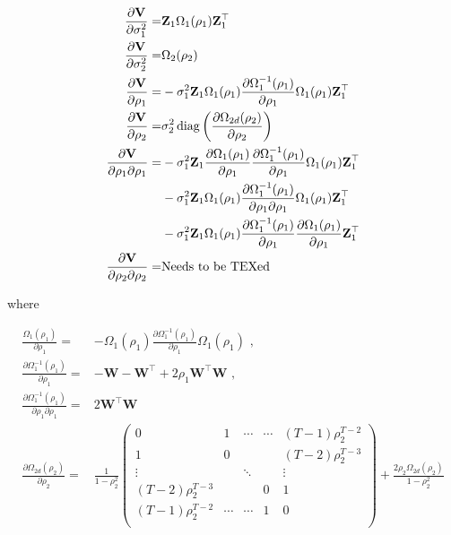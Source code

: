 \begin{align*}
\frac{\partial\mathbf{V}}{\partial\sigma_1^2} =& \mathbf{Z}_1\Omega_1(\rho_1)\mathbf{Z}_1^\top \\
\frac{\partial\mathbf{V}}{\partial\sigma_2^2} =& \Omega_2(\rho_2) \\
\frac{\partial\mathbf{V}}{\partial\rho_1} =& -\sigma_1^2\mathbf{Z}_1\Omega_1(\rho_1)\frac{\partial\Omega_1^{-1}(\rho_1)}{\partial\rho_1}\Omega_1(\rho_1)\mathbf{Z}^\top_1 \\
\frac{\partial\mathbf{V}}{\partial\rho_2} =& \sigma_2^2 \operatorname{diag}\left(\frac{\partial\Omega_{2d}(\rho_2)}{\partial\rho_2}\right) \\
\frac{\partial\mathbf{V}}{\partial\rho_1\partial\rho_1} =& -\sigma_1^2\mathbf{Z}_1\frac{\partial\Omega_1(\rho_1)}{\partial\rho_1}\frac{\partial\Omega_1^{-1}(\rho_1)}{\partial\rho_1}\Omega_1(\rho_1)\mathbf{Z}^\top_1 \\
&-\sigma_1^2\mathbf{Z}_1\Omega_1(\rho_1)\frac{\partial\Omega_1^{-1}(\rho_1)}{\partial\rho_1\partial\rho_1}\Omega_1(\rho_1)\mathbf{Z}^\top_1 \\
&-\sigma_1^2\mathbf{Z}_1\Omega_1(\rho_1)\frac{\partial\Omega_1^{-1}(\rho_1)}{\partial\rho_1}\frac{\partial\Omega_1(\rho_1)}{\partial\rho_1}\mathbf{Z}^\top_1 \\
\frac{\partial\mathbf{V}}{\partial\rho_2\partial\rho_2} =& \text{Needs to be TEXed}
\end{align*}

where

\begin{align*}
\frac{\Omega_1(\rho_1)}{\partial\rho_1} =& -\Omega_1(\rho_1)\frac{\partial\Omega_1^{-1}(\rho_1)}{\partial\rho_1}\Omega_1(\rho_1) \text{ , }\\
\frac{\partial\Omega_1^{-1}(\rho_1)}{\partial\rho_1} =& -\mathbf{W} - \mathbf{W}^\top + 2\rho_1\mathbf{W}^\top\mathbf{W} \text{ , } \\
\frac{\partial\Omega_1^{-1}(\rho_1)}{\partial\rho_1\partial\rho_1} =& 2\mathbf{W}^\top\mathbf{W}\\
\frac{\partial\Omega_{2d}(\rho_2)}{\partial\rho_2} =& \frac{1}{1-\rho_2^2}
\left(
\begin{matrix}
0 & 1 & \cdots & \cdots & (T-1)\rho_2^{T-2}\\
1 & 0 & & & (T-2)\rho_2^{T-3} \\
\vdots & & \ddots & & \vdots \\
(T-2)\rho_2^{T-3} &&& 0 & 1 \\
(T-1)\rho_2^{T-2} & \cdots & \cdots & 1 & 0\\
\end{matrix}
\right) + \frac{2\rho_2\Omega_{2d}(\rho_2)}{1-\rho_2^2}
\end{align*}

